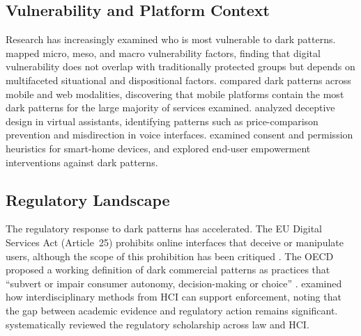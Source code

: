 \documentclass[a4paper,fleqn]{cas-sc}
\begin{document}
\subsection{Vulnerability and Platform Context}
Research has increasingly examined who is most vulnerable to dark patterns. \citet{rossi2024} mapped micro, meso, and macro vulnerability factors, finding that digital vulnerability does not overlap with traditionally protected groups but depends on multifaceted situational and dispositional factors. \citet{gunawan2021} compared dark patterns across mobile and web modalities, discovering that mobile platforms contain the most dark patterns for the large majority of services examined. \citet{deconca2023} analyzed deceptive design in virtual assistants, identifying patterns such as price-comparison prevention and misdirection in voice interfaces. \citet{chalhoub2024} examined consent and permission heuristics for smart-home devices, and \citet{lu2024} explored end-user empowerment interventions against dark patterns.

\subsection{Regulatory Landscape}
The regulatory response to dark patterns has accelerated. The EU Digital Services Act (Article~25) prohibits online interfaces that deceive or manipulate users, although the scope of this prohibition has been critiqued \citep{isola2025}. The OECD proposed a working definition of dark commercial patterns as practices that ``subvert or impair consumer autonomy, decision-making or choice'' \citep{oecd2022}. \citet{gunawan2025} examined how interdisciplinary methods from HCI can support enforcement, noting that the gap between academic evidence and regulatory action remains significant. \citet{yi2025} systematically reviewed the regulatory scholarship across law and HCI.
\end{document}
